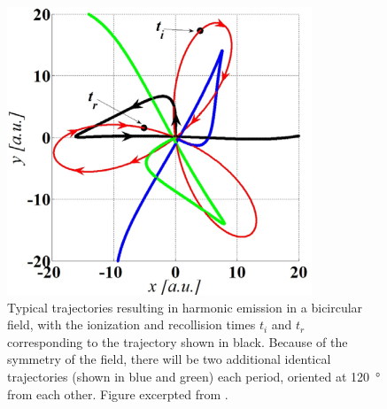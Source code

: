 \begin{figure}[h!]
  
  \vspace{10mm}
  
  \centering
  \includegraphics[scale=0.8]{8-Spin-HHG/Figures/figure8D.png}
  \caption[
  Typical trajectories that result in HHG emission from bicircular fields, as calculated by A. Fleischer~et~al.
  ]{
  Typical trajectories resulting in harmonic emission in a bicircular field, with the ionization and recollision times $t_i$ and $t_r$ corresponding to the trajectory shown in black. Because of the symmetry of the field, there will be two additional identical trajectories (shown in blue and green) each period, oriented at \SI{120}{\degree} from each other.
  Figure excerpted from .
  }
  \label{f8-fleischer-trajectories}
  
  \vspace{15mm}
  
  
  

\end{figure}
